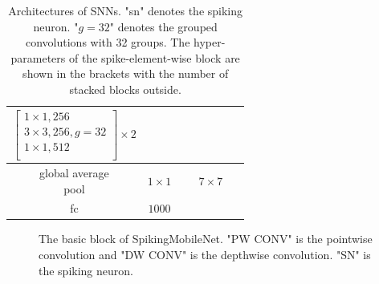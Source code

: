 \documentclass[letterpaper]{article} %
\begin{document}
\begin{table}[t]
{\begin{tabular}{|c|c|c|c|c|c|c|c|}
			$\begin{bmatrix}
				1 \times 1, 256 \\
				3 \times 3, 256, g = 32 \\
				1 \times 1, 512 \\
			\end{bmatrix} \times 2$ \\
			\hline
			\thead{global average \\ pool} & $1 \times 1$ & \multicolumn{6}{c|}{$7 \times 7$} \\
			\hline
			fc & $1000$ & \multicolumn{6}{c|}{} \\
			\hline
		\end{tabular}
	}
	\caption{Architectures of SNNs. "sn" denotes the spiking neuron. "$g = 32$" denotes the grouped convolutions with 32 groups. The hyper-parameters of the spike-element-wise block are shown in the brackets with the number of stacked blocks outside.}
	\label{table.snn}
\end{table}

\begin{figure}[t]
	\centering
	\caption{The basic block of SpikingMobileNet. "PW CONV" is the pointwise convolution and "DW CONV" is the depthwise convolution. "SN" is the spiking neuron.}
	\label{Fig.spikingmobilenet}
\end{figure}
\end{document}
